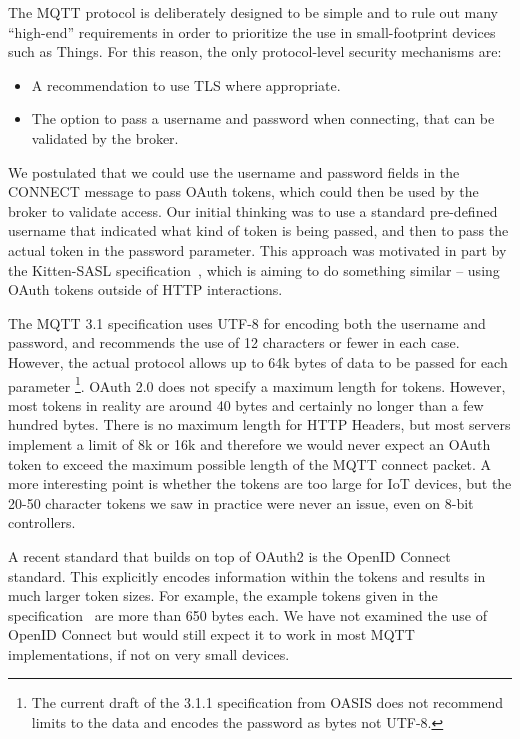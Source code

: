 \documentclass{IEEEtran}
\begin{document}
The MQTT protocol is deliberately designed to be simple and to rule out many ``high-end'' 
requirements in order to prioritize the use in small-footprint devices such as Things. For this
reason, the only protocol-level security mechanisms are:
\begin{itemize}
\item{A recommendation to use TLS where appropriate.}
\item{The option to pass a username and password when connecting, that can be validated by the broker.}
\end{itemize}

We postulated that we could use the username and password fields in the CONNECT message 
to pass OAuth tokens, which 
could then be used by the broker to validate access. Our initial thinking was to use a 
standard pre-defined username that indicated what kind of token is being passed, and then to 
pass the actual token in the password parameter. This approach was motivated in part by the
Kitten-SASL specification~\cite{mills2011sasl}, which is aiming to do something similar -- 
using OAuth tokens outside of HTTP interactions. 

The MQTT 3.1 specification uses UTF-8 for encoding both the username and password, and recommends
the use of 12 characters or fewer in each case. However, the actual protocol allows up to 
64k bytes of data to be passed for each parameter
\footnote{The current draft of the 3.1.1 specification from OASIS does not
recommend limits to the data and encodes the password as bytes not UTF-8.}. 
OAuth 2.0 does not specify a maximum length for tokens. However, most tokens in reality are around 40 bytes and certainly no 
longer than a few hundred bytes. There is no maximum length for HTTP Headers, but most servers implement 
a limit of 8k or 16k and therefore we would never expect an OAuth token to exceed the maximum 
possible length of the MQTT connect packet. A more interesting point is whether the tokens are too 
large for IoT devices, but the 20-50 character tokens we saw in practice were never an issue,
even on 8-bit controllers. 

A recent standard that builds on top of OAuth2 is the OpenID Connect standard. This explicitly encodes 
information within the tokens and results in much larger token sizes. For example, the example tokens given in the
specification~\cite{openid-connect-core} are more than 650 bytes each. We have not examined the use of OpenID Connect
but would still expect it to work in most MQTT implementations, if not on very small devices.
\end{document}
